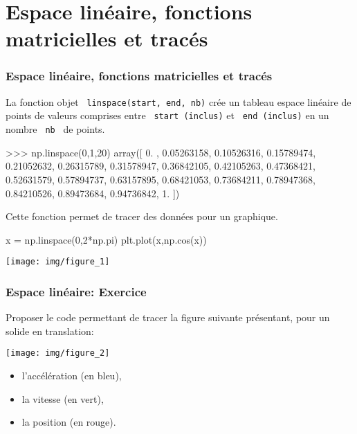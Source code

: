 \section{Espace linéaire, fonctions matricielles et tracés} 

\begin{frame}[fragile]
\frametitle{Espace linéaire, fonctions matricielles et tracés}

La fonction objet \verb? linspace(start, end, nb)? crée un tableau espace linéaire de points de valeurs comprises entre \verb? start (inclus)? et \verb? end (inclus)? en un nombre \verb? nb ? de points.

\begin{GrayBox}[0.95\textwidth]
\begin{verbatimtab}[3]
>>> np.linspace(0,1,20)
array([ 0.        ,  0.05263158,  0.10526316,  0.15789474,  0.21052632,
        0.26315789,  0.31578947,  0.36842105,  0.42105263,  0.47368421,
        0.52631579,  0.57894737,  0.63157895,  0.68421053,  0.73684211,
        0.78947368,  0.84210526,  0.89473684,  0.94736842,  1.        ])
\end{verbatimtab}
\end{GrayBox}

\begin{minipage}{0.45\linewidth}
\begin{GrayBox}[0.85\textwidth]
Cette fonction permet de tracer des données pour un graphique.\\
\begin{verbatimtab}[3]
x = np.linspace(0,2*np.pi)
plt.plot(x,np.cos(x))
\end{verbatimtab}
\end{GrayBox}
\end{minipage}\hfill
\begin{minipage}{0.45\linewidth}
 \texttt{[image: img/figure\_1]}
\end{minipage}

\end{frame}

\begin{frame}[fragile]
\frametitle{Espace linéaire: Exercice}
Proposer le code permettant de tracer la figure suivante présentant, pour un solide en translation:\\
\begin{minipage}{0.46\linewidth}
\texttt{[image: img/figure\_2]}
\end{minipage}\hfill
\begin{minipage}{0.46\linewidth}
\begin{itemize}
 \item l'accélération (en bleu),
 \item la vitesse (en vert),
 \item la position (en rouge).
\end{itemize}
\end{minipage}
\vspace{3cm}
\end{frame}

